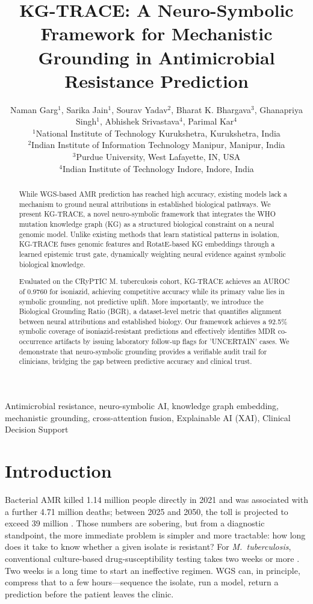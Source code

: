 \documentclass[conference]{IEEEtran}
\title{KG-TRACE: A Neuro-Symbolic Framework for Mechanistic Grounding in Antimicrobial Resistance Prediction}
\author{
\normalsize
Naman Garg$^{1}$,
Sarika Jain$^{1}$,
Sourav Yadav$^{2}$,
Bharat K. Bhargava$^{3}$,
Ghanapriya Singh$^{1}$,
Abhishek Srivastava$^{4}$,
Parimal Kar$^{4}$\\[1ex]

\small
$^{1}$National Institute of Technology Kurukshetra, Kurukshetra, India\\
$^{2}$Indian Institute of Information Technology Manipur, Manipur, India\\
$^{3}$Purdue University, West Lafayette, IN, USA\\
$^{4}$Indian Institute of Technology Indore, Indore, India
}
\begin{document}
\maketitle

\begin{abstract}
While WGS-based AMR prediction has reached high accuracy, existing models lack a mechanism to ground neural attributions in established biological pathways. We present KG-TRACE, a novel neuro-symbolic framework that integrates the WHO mutation knowledge graph (KG) as a structured biological constraint on a neural genomic model. Unlike existing methods that learn statistical patterns in isolation, KG-TRACE fuses genomic features and RotatE-based KG embeddings through a learned epistemic trust gate, dynamically weighting neural evidence against symbolic biological knowledge.

Evaluated on the CRyPTIC M. tuberculosis cohort, KG-TRACE achieves an AUROC of 0.9760 for isoniazid, achieving competitive accuracy while its primary value lies in symbolic grounding, not predictive uplift. More importantly, we introduce the Biological Grounding Ratio (BGR), a dataset-level metric that quantifies alignment between neural attributions and established biology. Our framework achieves a 92.5\% symbolic coverage of isoniazid-resistant predictions and effectively identifies MDR co-occurrence artifacts by issuing laboratory follow-up flags for 'UNCERTAIN' cases. We demonstrate that neuro-symbolic grounding provides a verifiable audit trail for clinicians, bridging the gap between predictive accuracy and clinical trust.
\end{abstract}

\begin{IEEEkeywords}
Antimicrobial resistance, neuro-symbolic AI, knowledge graph embedding, mechanistic grounding, cross-attention fusion, Explainable AI (XAI), Clinical Decision Support
\end{IEEEkeywords}

\section{Introduction}\label{sec:intro}

Bacterial AMR killed 1.14 million people directly in 2021 and was associated with a further 4.71 million deaths; between 2025 and 2050, the toll is projected to exceed 39 million \cite{gram2024}. Those numbers are sobering, but from a diagnostic standpoint, the more immediate problem is simpler and more tractable: how long does it take to know whether a given isolate is resistant? For \textit{M.~tuberculosis}, conventional culture-based drug-susceptibility testing takes two weeks or more \cite{mykrobe}. Two weeks is a long time to start an ineffective regimen. WGS can, in principle, compress that to a few hours---sequence the isolate, run a model, return a prediction before the patient leaves the clinic.
\end{document}
